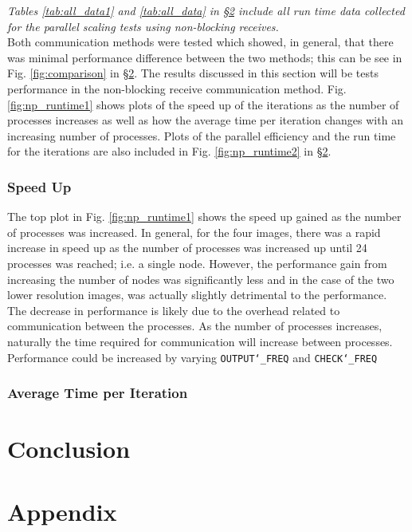 \documentclass[11pt, a4paper]{article}
\begin{document}
		\textit{Tables \ref{tab:all_data1} and \ref{tab:all_data} in \S\ref{sect:appendix} include all run time data collected for the parallel scaling tests using non-blocking receives.}\\
		
		\noindent Both communication methods were tested which showed, in general, that there was minimal performance difference between the two methods; this can be see in Fig. \ref{fig:comparison} in \S\ref{sect:appendix}. The results discussed in this section will be tests performance in the non-blocking receive communication method. Fig. \ref{fig:np_runtime1} shows plots of the speed up of the iterations as the number of processes increases as well as how the average time per iteration changes with an increasing number of processes. Plots of the parallel efficiency and the run time for the iterations are also included in Fig. \ref{fig:np_runtime2} in \S\ref{sect:appendix}.
		
		\subsubsection{Speed Up}
			The top plot in Fig. \ref{fig:np_runtime1} shows the speed up gained as the number of processes was increased. In general, for the four images, there was a rapid increase in speed up as the number of processes was increased up until 24 processes was reached; i.e. a single node. However, the performance gain from increasing the number of nodes was significantly less and in the case of the two lower resolution images, was actually slightly detrimental to the performance. The decrease in performance is likely due to the overhead related to communication between the processes. As the number of processes increases, naturally the time required for communication will increase between processes. Performance could be increased by varying \texttt{OUTPUT\char`_FREQ} and \texttt{CHECK\char`_FREQ}
		
		\subsubsection{Average Time per Iteration}
			
		
	\section{Conclusion}
		
	\newpage
	\section{Appendix} \label{sect:appendix}
		
\end{document}
